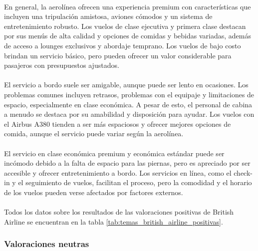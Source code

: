 \documentclass{report}
\begin{document}
{{                    \paragraph*{}{
                        En general, la aerolínea ofrecen una experiencia premium con características que incluyen una tripulación amistosa, aviones cómodos y un sistema de entretenimiento robusto. Los vuelos de clase ejecutiva y primera clase destacan por sus menús de alta calidad y opciones de comidas y bebidas variadas, además de acceso a lounges exclusivos y abordaje temprano. Los vuelos de bajo costo brindan un servicio básico, pero pueden ofrecer un valor considerable para pasajeros con presupuestos ajustados.
                    }
                    \paragraph*{}{
                        El servicio a bordo suele ser amigable, aunque puede ser lento en ocasiones. Los problemas comunes incluyen retrasos, problemas con el equipaje y limitaciones de espacio, especialmente en clase económica. A pesar de esto, el personal de cabina a menudo se destaca por su amabilidad y disposición para ayudar. Los vuelos con el Airbus A380 tienden a ser más espaciosos y ofrecer mejores opciones de comida, aunque el servicio puede variar según la aerolínea.
                    }
                    \paragraph*{}{
                        El servicio en clase económica premium y económica estándar puede ser incómodo debido a la falta de espacio para las piernas, pero es apreciado por ser accesible y ofrecer entretenimiento a bordo. Los servicios en línea, como el check-in y el seguimiento de vuelos, facilitan el proceso, pero la comodidad y el horario de los vuelos pueden verse afectados por factores externos.
                    }
                    \paragraph*{}{
                        Todos los datos sobre los resultados de las valoraciones positivas de British Airline se encuentran en la tabla \ref{tab:temas_british_airline_positivas}.
                    }
                \subsubsection*{Valoraciones neutras}
}}
\end{document}
